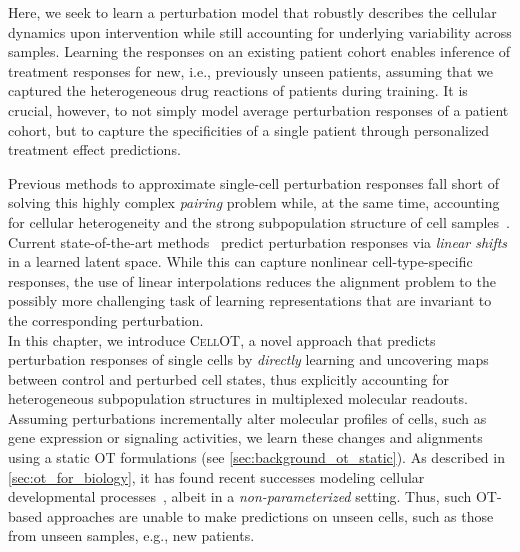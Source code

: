 Here, we seek to learn a perturbation model that robustly describes the cellular dynamics upon intervention while still accounting for underlying variability across samples. Learning the responses on an existing patient cohort enables inference of treatment responses for new, i.e., previously unseen patients, assuming that we captured the heterogeneous drug reactions of patients during training.
It is crucial, however, to not simply model average perturbation responses of a patient cohort, but to capture the specificities of a single patient through personalized treatment effect predictions.

 Previous methods to approximate single-cell perturbation responses fall short of solving this highly complex \emph{pairing} problem while, at the same time, accounting for cellular heterogeneity and the strong subpopulation structure of cell samples~\citep{wu2021single,gonzalez2020tumor,li2022single}. 
Current state-of-the-art methods~\citep{lopez2018scvi, lotfollahi2019scgen, yang2020predicting} predict perturbation responses via \emph{linear shifts} in a learned %
latent space.
While this can capture nonlinear cell-type-specific responses, the use of linear interpolations reduces the alignment problem to the possibly more challenging task of learning representations that are invariant to the corresponding perturbation. \\

 In this chapter, we introduce \textsc{CellOT}, a novel approach that predicts perturbation responses of single cells by \emph{directly} learning and uncovering maps between control and perturbed cell states, thus explicitly accounting for heterogeneous subpopulation structures in multiplexed molecular readouts.
Assuming perturbations incrementally alter molecular profiles of cells, such as gene expression or signaling activities, we learn these changes and alignments using a static \acrlong{OT} formulations (see \cref{sec:background_ot_static}). 
As described in \cref{sec:ot_for_biology}, it has found recent successes modeling cellular developmental processes~\citep{lavenant2021towards, schiebinger2019optimal}, albeit in a {\em non-parameterized} setting. Thus, such OT-based approaches are unable to make predictions on unseen cells, such as those from unseen samples, e.g., new patients. 


